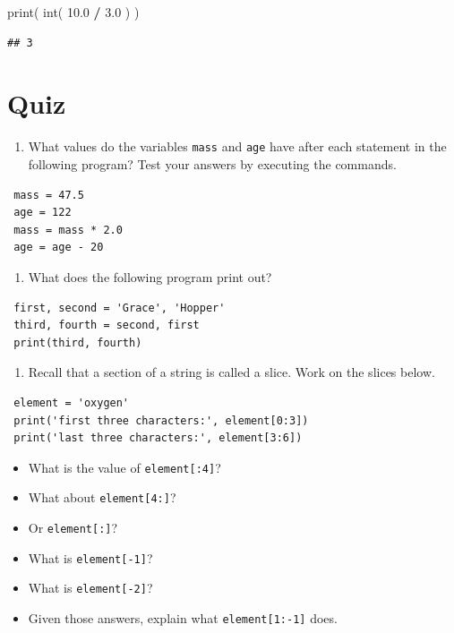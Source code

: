 \documentclass[]{book}
\newenvironment{Shaded}{\begin{snugshade}}{\end{snugshade}}
\newcommand{\BuiltInTok}[1]{#1}
\newcommand{\FloatTok}[1]{\textcolor[rgb]{0.00,0.00,0.81}{#1}}
\newcommand{\NormalTok}[1]{#1}
\newcommand{\OperatorTok}[1]{\textcolor[rgb]{0.81,0.36,0.00}{\textbf{#1}}}
\providecommand{\tightlist}{%
  \setlength{\itemsep}{0pt}\setlength{\parskip}{0pt}}
\theoremstyle{definition}
\theoremstyle{definition}
\theoremstyle{definition}
\theoremstyle{remark}
\begin{document}
\begin{Shaded}
\begin{Highlighting}[]
\BuiltInTok{print}\NormalTok{( }\BuiltInTok{int}\NormalTok{( }\FloatTok{10.0} \OperatorTok{/} \FloatTok{3.0}\NormalTok{ ) )}
\end{Highlighting}
\end{Shaded}

\begin{verbatim}
## 3
\end{verbatim}

\hypertarget{quiz}{%
\section{Quiz}\label{quiz}}

\begin{enumerate}
\def\labelenumi{\arabic{enumi}.}
\tightlist
\item
  What values do the variables \texttt{mass} and \texttt{age} have after
  each statement in the following program? Test your answers by
  executing the commands.
\end{enumerate}

\begin{verbatim}
 mass = 47.5
 age = 122
 mass = mass * 2.0
 age = age - 20
\end{verbatim}

\begin{enumerate}
\def\labelenumi{\arabic{enumi}.}
\setcounter{enumi}{1}
\tightlist
\item
  What does the following program print out?
\end{enumerate}

\begin{verbatim}
 first, second = 'Grace', 'Hopper'
 third, fourth = second, first
 print(third, fourth)
\end{verbatim}

\begin{enumerate}
\def\labelenumi{\arabic{enumi}.}
\setcounter{enumi}{2}
\tightlist
\item
  Recall that a section of a string is called a slice. Work on the
  slices below.
\end{enumerate}

\begin{verbatim}
 element = 'oxygen'
 print('first three characters:', element[0:3])
 print('last three characters:', element[3:6])
\end{verbatim}

\begin{itemize}
\tightlist
\item
  What is the value of \texttt{element{[}:4{]}}?
\item
  What about \texttt{element{[}4:{]}}?
\item
  Or \texttt{element{[}:{]}}?
\item
  What is \texttt{element{[}-1{]}}?
\item
  What is \texttt{element{[}-2{]}}?
\item
  Given those answers, explain what \texttt{element{[}1:-1{]}} does.
\end{itemize}
\end{document}
